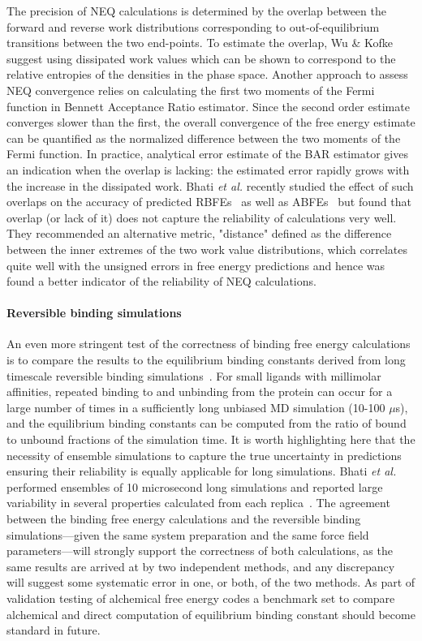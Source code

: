 \documentclass[9pt,bestpractices]{livecoms}
\begin{document}
 The precision of NEQ calculations is determined by the overlap between the forward and reverse work distributions corresponding to out-of-equilibrium transitions between the two end-points. To estimate the overlap, Wu \& Kofke suggest using dissipated work values which can be shown to correspond to the relative entropies of the densities in the phase space. \cite{wu2005phase} Another approach to assess NEQ convergence relies on calculating the first two moments of the Fermi function in Bennett Acceptance Ratio estimator. \cite{hahn2010measuring} Since the second order estimate converges slower than the first, the overall convergence of the free energy estimate can be quantified as the normalized difference between the two moments of the Fermi function. In practice, analytical error estimate of the BAR estimator \cite{shirts2003equilibrium} gives an indication when the overlap is lacking: the estimated error rapidly grows with the increase in the dissipated work. \cite{shirts2005comparison} Bhati \textit{et al.} recently studied the effect of such overlaps on the accuracy of predicted RBFEs~\cite{wan2023eqvsneq} as well as ABFEs~\cite{bhati2025} but found that overlap (or lack of it) does not capture the reliability of calculations very well. They recommended an alternative metric, "distance" defined as the difference between the inner extremes of the two work value distributions, which correlates quite well with the unsigned errors in free energy predictions and hence was found a better indicator of the reliability of NEQ calculations. 

\paragraph{Reversible binding simulations}
An even more stringent test of the correctness of binding free energy calculations is to compare the results to the equilibrium binding constants derived from long timescale reversible binding simulations~\cite{pan2017quantitative}. For small ligands with millimolar affinities, repeated binding to and unbinding from the protein can occur for a large number of times in a sufficiently long unbiased MD simulation (10-100 $\mu$s), and the equilibrium binding constants can be computed from the ratio of bound to unbound fractions of the simulation time. 
It is worth highlighting here that the necessity of ensemble simulations to capture the true uncertainty in predictions ensuring their reliability is equally applicable for long simulations. Bhati \textit{et al.} performed ensembles of 10 microsecond long simulations and reported large variability in several properties calculated from each replica~\cite{bhati2023}.
The agreement between the binding free energy calculations and the reversible binding simulations---given the same system preparation and the same force field parameters---will strongly support the correctness of both calculations, as the same results are arrived at by two independent methods, and any discrepancy will suggest some systematic error in one, or both, of the two methods. As part of validation testing of alchemical free energy codes a benchmark set to compare alchemical and direct computation of equilibrium binding constant should become standard in future.
\end{document}
